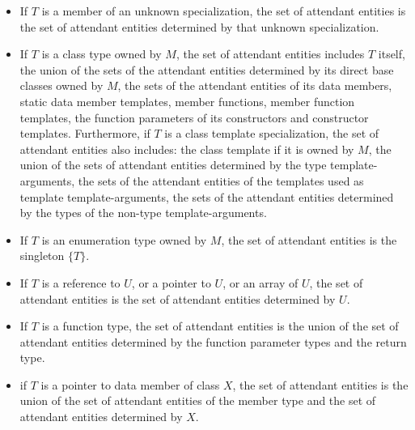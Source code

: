 \begin{std.txt}
\begin{before}
\begin{itemize}
    \item\color{addclr} If $T$ is a member of an unknown specialization, the set of
    attendant entities is the set of attendant entities determined by that
    unknown specialization.

    \item\color{addclr} If $T$ is a class type owned by $M$, the set of attendant entities includes
    $T$ itself, the union of the sets of the attendant entities determined
    by its direct base classes owned by $M$, the sets of the
    attendant entities of its data members, static data member templates,
    member functions, member function templates, 
    the function parameters of its constructors and constructor templates.  
    Furthermore, if $T$ is a 
    class template specialization, the set of attendant entities also 
    includes: the class template if it is owned by $M$,
    the union of the sets of attendant entities determined by the type
    template-arguments, the sets of the attendant entities of the templates
    used as template template-arguments, the sets of the attendant entities
    determined by the types of the non-type template-arguments.

    \item\color{addclr} If $T$ is an enumeration type owned by $M$, 
    the set of attendant entities is the singleton $\{T\}$.

    \item\color{addclr} If $T$ is a reference to $U$, or a pointer to $U$, or an array of $U$, 
    the set of attendant entities is the set of attendant entities determined by $U$.

    \item\color{addclr} If $T$ is a function type, the set of attendant entities is the
    union of the set of attendant entities determined by the function
    parameter types and the return type.

    \item\color{addclr} if $T$ is a pointer to data member of class $X$, the set of attendant
    entities is the union of the set of attendant entities of the member type
    and the set of attendant entities determined by $X$.
    

\end{itemize}
\end{before}
\end{std.txt}
